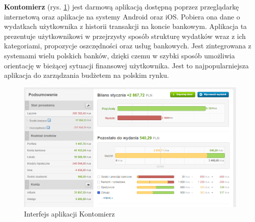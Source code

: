 \textbf{Kontomierz} (rys. \ref{kontomierz_interfejs}) jest darmową aplikacją dostępną poprzez przeglądarkę internetową oraz aplikacje na systemy Android oraz iOS. Pobiera ona dane o wydatkach użytkownika z historii transakcji na koncie bankowym. Aplikacja ta prezentuje użytkownikowi w przejrzysty sposób strukturę wydatków wraz z ich kategoriami, propozycje oszczędności oraz usług bankowych. Jest zintegrowana z systemami wielu polskich banków, dzięki czemu w szybki sposób umożliwia orientację w bieżącej sytuacji finansowej użytkownika. Jest to najpopularniejsza aplikacja do zarządzania budżetem na polskim rynku.
\begin{figure}[!ht]
	\begin{center}
		\includegraphics[width=6in]{img/aplikacje/kontomierz_interfejs.png}
		\caption{Interfejs aplikacji Kontomierz}
		\label{kontomierz_interfejs}
	\end{center}
\end{figure}

